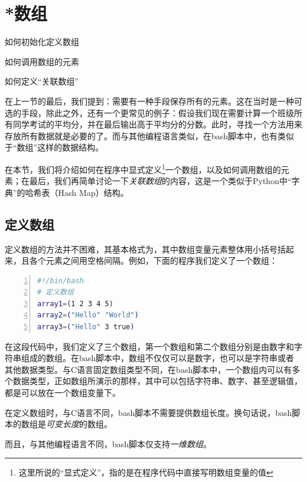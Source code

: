 \section{*数组}\label{sec:数组}

\begin{Abstract}
    \item 如何初始化定义数组
    \item 如何调用数组的元素
    \item 如何定义“关联数组”
\end{Abstract}

在上一节的最后，我们提到：需要有一种手段保存所有的元素。这在当时是一种可选的手段，除此之外，还有一个更常见的例子：假设我们现在需要计算一个班级所有同学考试的平均分，并在最后输出高于平均分的分数。此时，寻找一个方法用来存放所有数据就是必要的了。而与其他编程语言类似，在bash脚本中，也有类似于“数组”这样的数据结构。

在本节，我们将介绍如何在程序中显式定义\footnote{这里所说的“显式定义”，指的是在程序代码中直接写明数组变量的值}一个数组，以及如何调用数组的元素；在最后，我们再简单讨论一下\emph{关联数组}的内容，这是一个类似于Python中“字典”的哈希表（Hash Map）结构。

\subsection{定义数组}\label{subsec:数组-定义数组}

定义数组的方法并不困难，其基本格式为，其中数组变量元素整体用小括号括起来，且各个元素之间用空格间隔。例如，下面的程序我们定义了一个数组：

\begin{lstlisting}[language=bash,numbers=left,caption={array\_test}]
#!/bin/bash
# 定义数组
array1=(1 2 3 4 5)
array2=("Hello" "World")
array3=("Hello" 3 true)
\end{lstlisting}

在这段代码中，我们定义了三个数组，第一个数组和第二个数组分别是由数字和字符串组成的数组。在bash脚本中，数组不仅仅可以是数字，也可以是字符串或者其他数据类型。与C语言固定数组类型不同，在bash脚本中，一个数组内可以有多个数据类型，正如数组所演示的那样，其中可以包括字符串、数字、甚至逻辑值，都是可以放在一个数组变量下。

\begin{attention}
    在定义数组时，与C语言不同，bash脚本不需要提供数组长度。换句话说，bash脚本的数组是\emph{可变长度}的数组。

    而且，与其他编程语言不同，bash脚本仅支持\emph{一维数组}。
\end{attention}


